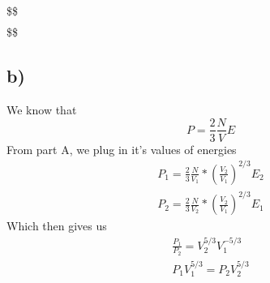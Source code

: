 \documentclass[]{article}
\begin{document}
\$\$ \begin{align}

\end{align} \$\$

\hypertarget{b-1}{%
\subsection{b)}\label{b-1}}

We know that \[
P = \frac{2}{3}\frac{N}{V}E
\] From part A, we plug in it's values of energies \[
\begin{align}
P_{1}= \frac{2}{3} \frac{N}{V_{1}}*\left( \frac{V_{2}}{V_{1}} \right)^{2/3}E_{2} \\
P_{2}= \frac{2}{3} \frac{N}{V_{2}}*\left( \frac{V_{2}}{V_{1}} \right)^{2/3}E_{1}
\end{align}
\] Which then gives us \[
\begin{align}
\frac{P_{1}}{P_{2}} = V_{2}^{5/3}V_{1}^{-5/3} \\
P_{1}V_{1}^{5/3} = P_{2}V_{2}^{5/3}
\end{align}
\]
\end{document}
